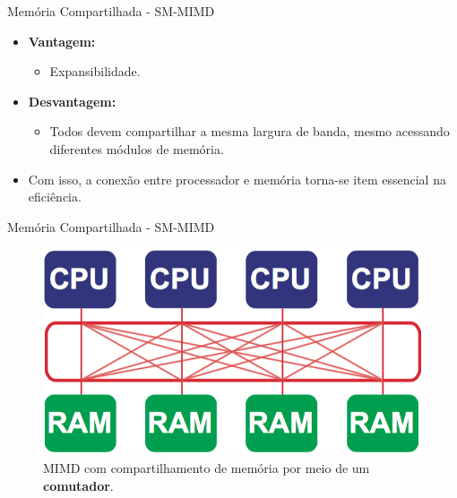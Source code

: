 \begin{frame}{Memória Compartilhada - SM-MIMD}
	\begin{itemize}
		\item \textbf{Vantagem:}
		\begin{itemize}
	    	\item Expansibilidade.
		\end{itemize}

			\bigskip

		\item \textbf{Desvantagem:}
		\begin{itemize}
		    \item Todos devem compartilhar a mesma largura de banda, mesmo acessando diferentes módulos de memória.
		\end{itemize}

		\item Com isso, a conexão entre processador e memória torna-se item essencial na eficiência.
	\end{itemize}

\end{frame}


\begin{frame}{Memória Compartilhada - SM-MIMD}
    \begin{figure}[h]
    	\centering
    	\includegraphics[width=1\textwidth]{img/tobias/sm-mimd3.png}
    	\caption{MIMD com compartilhamento de memória por meio de um {\bf comutador}.}
    	\label{fig:sm-mimd3}
    \end{figure}

\end{frame}


